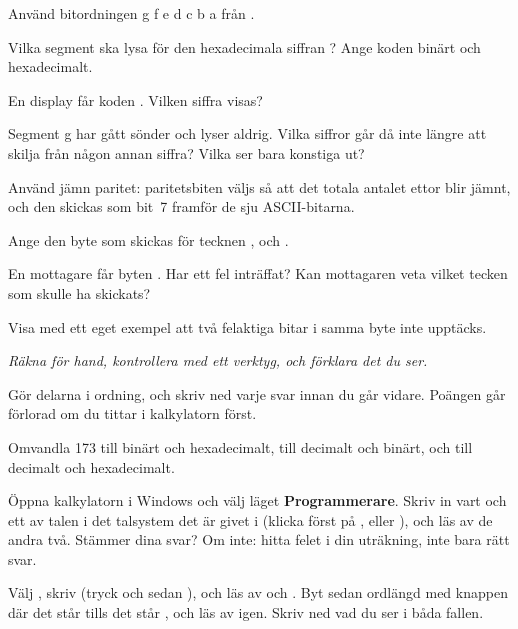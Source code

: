 \label{c1:ex:11}
Använd bitordningen g f e d c b a från .
\begin{parts}
  \item Vilka segment ska lysa för den hexadecimala siffran ? Ange koden binärt och
    hexadecimalt.
  \item En display får koden . Vilken siffra visas?
  \item Segment g har gått sönder och lyser aldrig. Vilka siffror går då inte längre att skilja från
    någon annan siffra? Vilka ser bara konstiga ut?
\end{parts}

\label{c1:ex:12}
Använd jämn paritet: paritetsbiten väljs så att det totala antalet ettor blir jämnt, och den skickas
som bit~7 framför de sju ASCII-bitarna.
\begin{parts}
  \item Ange den byte som skickas för tecknen ,  och .
  \item En mottagare får byten . Har ett fel inträffat? Kan mottagaren veta vilket
    tecken som skulle ha skickats?
  \item Visa med ett eget exempel att två felaktiga bitar i samma byte inte upptäcks.
\end{parts}

\label{c1:ex:13}
\emph{Räkna för hand, kontrollera med ett verktyg, och förklara det du ser.}

Gör delarna i ordning, och skriv ned varje svar innan du går vidare. Poängen går förlorad om du
tittar i kalkylatorn först.

Omvandla 173 till binärt och hexadecimalt,  till decimalt och binärt, och
 till decimalt och hexadecimalt.

Öppna kalkylatorn i Windows och välj läget \textbf{Programmerare}. Skriv in vart och ett av talen i
det talsystem det är givet i (klicka först på ,  eller ), och läs av
de andra två. Stämmer dina svar? Om inte: hitta felet i din uträkning, inte bara rätt svar.

Välj , skriv  (tryck  och sedan \code{+/-}), och läs av  och
. Byt sedan ordlängd med knappen där det står  tills det står , och
läs av igen. Skriv ned vad du ser i båda fallen.

